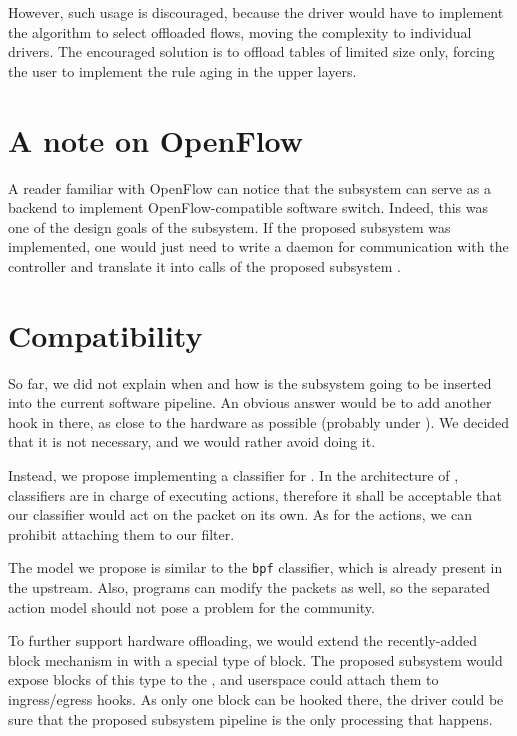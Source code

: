 However, such usage is discouraged, because the driver would have to
implement the algorithm to select offloaded flows, moving the complexity to
individual drivers. The encouraged solution is to offload tables of limited
size only, forcing the user to implement the rule aging in the upper layers.

\section{A note on OpenFlow}

A reader familiar with OpenFlow can notice that the subsystem can serve as
a backend to implement OpenFlow-compatible software switch. Indeed, this was
one of the design goals of the subsystem. If the proposed subsystem was
implemented, one would just need to write a daemon for communication with the
 controller and translate it into calls of the proposed subsystem
.

\section{Compatibility}
\label{rfc:tc}

So far, we did not explain when and how is the subsystem going to be inserted
into the current software pipeline. An obvious answer would be to add another
hook in there, as close to the hardware as possible (probably under ). We
decided that it is not necessary, and we would rather avoid doing it.

Instead, we propose implementing a classifier for . In the architecture
of , classifiers are in charge of executing actions, therefore it shall
be acceptable that our classifier would act on the packet on its own. As for
the  actions, we can prohibit attaching them to our filter.

The model we propose is similar to the \texttt{bpf}  classifier, which is already present
in the upstream. Also,  programs can modify the packets as well, so the
separated action model should not pose a problem for the community.

To further support hardware offloading, we would extend the recently-added
block mechanism in  with a special type of block. The proposed subsystem
would expose blocks of this type to the , and userspace could attach them
to  ingress/egress hooks. As only one block can be hooked there, the
driver could be sure that the proposed subsystem pipeline is the only
processing that happens.

